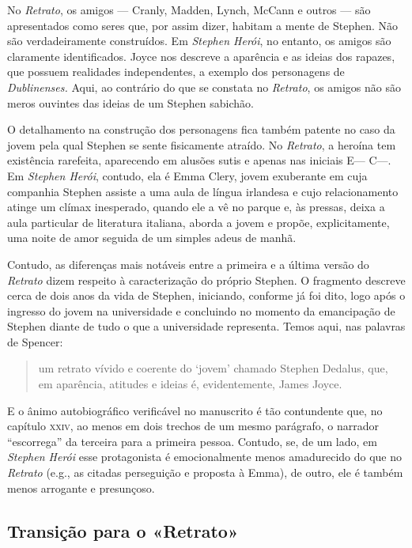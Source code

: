 No \textit{Retrato}, os amigos --- Cranly, Madden, Lynch, McCann e
outros --- são apresentados como seres que, por assim dizer, habitam a
mente de Stephen.  Não são verdadeiramente construídos.  Em
\textit{Stephen Herói}, no entanto, os amigos são claramente
identificados.  Joyce nos descreve a aparência e as ideias dos rapazes,
que possuem realidades independentes, a exemplo dos personagens de
\textit{Dublinenses.}  Aqui, ao contrário do que se constata no
\textit{Retrato}, os amigos não são meros ouvintes das ideias
de um Stephen sabichão.

O detalhamento na construção dos personagens fica também patente no
caso da jovem pela qual Stephen se sente fisicamente atraído.  No	
\textit{Retrato}, a heroína tem existência rarefeita, aparecendo em
alusões sutis e apenas nas iniciais E--- C---.  Em
\textit{Stephen Herói}, contudo, ela é Emma Clery, jovem exuberante em
cuja companhia Stephen assiste a uma aula de língua irlandesa e cujo
relacionamento atinge um clímax inesperado, quando ele a vê no parque
e, às pressas, deixa a aula particular de literatura italiana, aborda a
jovem e propõe, explicitamente, uma noite de amor seguida de um simples
adeus de manhã.

Contudo, as diferenças mais notáveis entre a primeira e a última
versão do \textit{Retrato} dizem respeito à caracterização do próprio
Stephen.  O fragmento descreve cerca de dois anos da vida de Stephen,
iniciando, conforme já foi dito, logo após o ingresso do jovem na
universidade e concluindo no momento da emancipação de Stephen diante
de tudo o que a universidade representa.  Temos aqui, nas palavras de
Spencer:

\begin{quote}
um retrato vívido e coerente do ‘jovem’ chamado Stephen
Dedalus, que, em aparência, atitudes e ideias é, evidentemente, James
Joyce.  
\end{quote}
 
E o ânimo autobiográfico verificável no manuscrito é tão		
contundente que, no capítulo \textsc{xxiv}, ao menos em dois trechos de um mesmo
parágrafo, o narrador “escorrega” da terceira para a primeira pessoa. 
Contudo, se, de um lado, em \textit{Stephen Herói} esse protagonista é
emocionalmente menos amadurecido do que no \textit{Retrato} (e.g., as
citadas perseguição e proposta à Emma), de outro, ele é também menos
arrogante e presunçoso.  


\subsection*{Transição para o «Retrato»}

